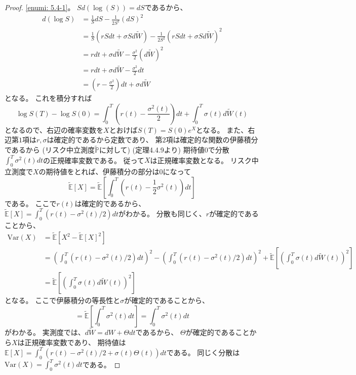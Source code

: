 \documentclass[uplatex]{jsarticle}
\theoremstyle{definition}
\def\P{\mathbb{P}}
\def\E{\mathbb{E}}
\newcommand{\Var}{\mathrm{Var}}
\begin{document}
\begin{proof}
  \ref{enumi: 5.4-1}。
  \(Sd(\log(S)) = dS\)であるから、
  \begin{align*}
    d(\log S) &= \frac{1}{S}dS - \frac{1}{2S^2}(dS)^2 \\
    &= \frac{1}{S}\left( rSdt + \sigma S d\tilde{W}\right)
    - \frac{1}{2S^2}\left( rSdt + \sigma S d\tilde{W}\right)^2 \\
    &= rdt + \sigma d\tilde{W} - \frac{\sigma^2}{2}(d\tilde{W})^2 \\
    &= rdt + \sigma d\tilde{W} - \frac{\sigma^2}{2}dt \\
    &= \left( r-\frac{\sigma^2}{2}\right)dt + \sigma d\tilde{W}
  \end{align*}
  となる。
  これを積分すれば
  \[
  \log S(T) - \log S(0)
  = \int_0^T \left( r(t)-\frac{\sigma^2(t)}{2}\right)dt
  + \int_0^T \sigma(t)d\tilde{W}(t)
  \]
  となるので、右辺の確率変数を\(X\)とおけば\(S(T) = S(0)e^X\)となる。
  また、右辺第\(1\)項は\(r,\sigma\)は確定的であるから定数であり、
  第\(2\)項は確定的な関数の伊藤積分であるから
  (リスク中立測度\(\tilde{\P}\)に対して) (定理4.4.9より)
  期待値\(0\)で分散
  \(\int_0^T \sigma^2(t)dt\)の正規確率変数である。
  従って\(X\)は正規確率変数となる。
  リスク中立測度で\(X\)の期待値をとれば、伊藤積分の部分は\(0\)になって
  \[
  \tilde{\E}[X]
  = \tilde{\E}\left[ \int_0^T \left(r(t) - \frac{1}{2}\sigma^2(t)\right) dt\right]
  \]
  である。
  ここで\(r(t)\)は確定的であるから、
  \(\tilde{\E}[X] = \int_0^T (r(t) - \sigma^2(t)/2) dt\)がわかる。
  分散も同じく、\(r\)が確定的であることから、
  \begin{align*}
    \Var(X) &= \tilde{\E}[X^2 - \tilde{\E}[X]^2] \\
    &= \left( \int_0^T (r(t) - \sigma^2(t)/2) dt\right)^2
    - \left( \int_0^T (r(t) - \sigma^2(t)/2) dt\right)^2
    + \tilde{\E}\left[ \left(
    \int_0^T \sigma(t)d\tilde{W}(t)\right)^2 \right] \\
    &= \tilde{\E}\left[ \left(
    \int_0^T \sigma(t)d\tilde{W}(t)\right)^2 \right]
  \end{align*}
  となる。
  ここで伊藤積分の等長性と\(\sigma\)が確定的であることから、
  \[
  = \tilde{\E} \left[ \int_0^T \sigma^2(t) dt \right]
  = \int_0^T \sigma^2(t) dt
  \]
  がわかる。
  実測度では、\(d\tilde{W} = dW + \Theta dt\)であるから、
  \(\Theta\)が確定的であることから\(X\)は正規確率変数であり、
  期待値は\(\E [X] = \int_0^T( r(t) - \sigma^2(t)/2 + \sigma(t)\Theta(t))dt\)である。
  同じく分散は\(\Var(X) = \int_0^T\sigma^2(t)dt\)である。


\end{proof}
\end{document}
